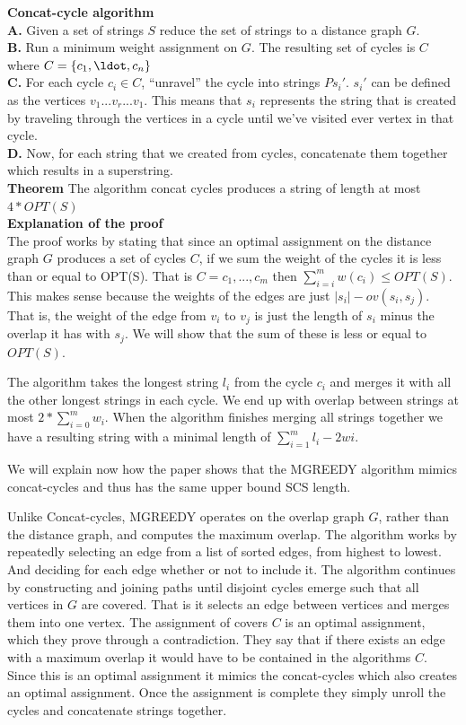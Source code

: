 \documentclass[letterpaper,11pt,titlepage]{article}
\begin{document}
\textbf{Concat-cycle algorithm}\\

\textbf{A.} Given a set of strings $S$ reduce the set of strings to a distance graph $G$. \\
\textbf{B.} Run a minimum weight assignment on $G$. The resulting set of cycles is $C$ where $C = \{c_1, \ldot, c_n\}$\\
\textbf{C.} For each cycle $c_i \in C$,  ``unravel'' the cycle into strings $Ps_i'$. $s_i'$ can be defined as the vertices $v_1 ... v_r ... v_1$. This means that $s_i$ represents the  string that is created by traveling through the vertices in a cycle until we've visited ever vertex in that cycle.\\
\textbf{D.} Now, for each string that we created from cycles, concatenate them together which results in a superstring.\\

\textbf{Theorem}
The algorithm concat cycles produces a string of length at most $4 * OPT(S)$\\

\textbf{Explanation of the proof}\\

The proof works by stating that since an optimal assignment on the distance graph $G$ produces a set of cycles $C$, if we sum the weight of the cycles it is less than or equal to OPT(S). That is $C = {c_1, ..., c_m}$ then $\sum_{i=i}^m w(c_i) \leq OPT(S)$. This makes sense because the weights of the edges are just $|s_i| - ov(s_i,s_j)$. That is, the weight of the edge from $v_i$ to $v_j$ is just the length of $s_i$ minus the overlap it has with $s_j$. We will show that the sum of these is less or equal to $OPT(S)$.

The algorithm takes the longest string $l_i$ from the cycle $c_i$ and merges it with all the other longest strings in each cycle. We end up with overlap between strings at most $2*\sum_{i=0}^m w_i$. When the algorithm finishes merging all strings together we have a resulting string with a minimal length of $\sum_{i=1}^m l_i - 2wi$.  

We will explain now how the paper shows that the MGREEDY algorithm mimics concat-cycles and thus has the same upper bound SCS length.

Unlike Concat-cycles, MGREEDY operates on the overlap graph $G$, rather than the distance graph, and computes the maximum overlap. The algorithm works by repeatedly selecting an edge from a list of sorted edges, from highest to lowest. And deciding for each edge whether or not to include it. The algorithm continues by constructing and joining paths until disjoint cycles emerge such that all vertices in $G$ are covered. That is it selects an edge between vertices and merges them into one vertex. The assignment of covers $C$ is an optimal assignment, which they prove through a contradiction. They say that if there exists an edge with a maximum overlap it would have to be contained in the algorithms $C$. Since this is an optimal assignment it mimics the concat-cycles which also creates an optimal assignment. Once the assignment is complete they simply unroll the cycles and concatenate strings together. 
\end{document}
